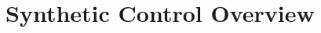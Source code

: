\documentclass[compress, 8pt]{beamer}
\begin{document}




\section[SC]{Synthetic Control Overview}
\miniframesoff
\begin{frame}
    \tableofcontents[currentsection]
\end{frame}
\miniframeson




 

\end{document}
